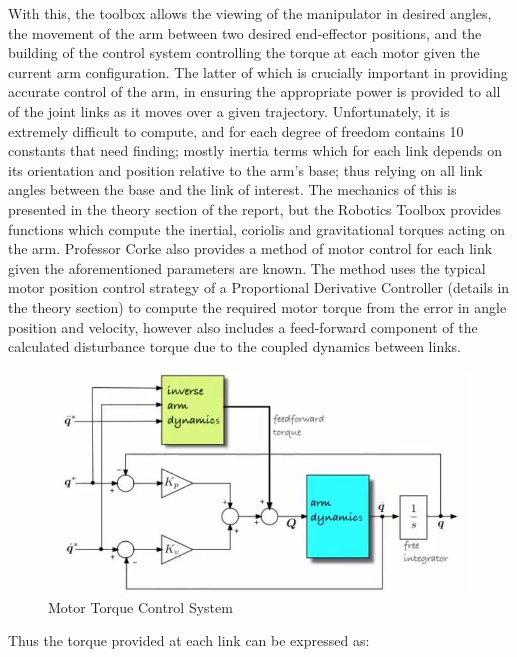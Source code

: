\documentclass[12pt,openany,a4paper]{book}
\begin{document}
With this, the toolbox allows the viewing of the manipulator in desired angles, the movement of the arm between two desired end-effector positions, and the building of the control system controlling the torque at each motor given the current arm configuration. The latter of which is crucially important in providing accurate control of the arm, in ensuring the appropriate power is provided to all of the joint links as it moves over a given trajectory. Unfortunately, it is extremely difficult to compute, and for each degree of freedom contains 10 constants that need finding; mostly inertia terms which for each link depends on its orientation and position relative to the arm's base; thus relying on all link angles between the base and the link of interest. The mechanics of this is presented in the theory section of the report, but the Robotics Toolbox provides functions which compute the inertial, coriolis and gravitational torques acting on the arm. Professor Corke also provides a method of motor control for each link given the aforementioned parameters are known. The method uses the typical motor position control strategy of a Proportional Derivative Controller (details in the theory section) to compute the required motor torque from the error in angle position and velocity, however also includes a feed-forward component of the calculated disturbance torque due to the coupled dynamics between links. 

\begin{center}
\begin{figure}[htb]
  \includegraphics[width=\linewidth]{Correcting_for_disturbance_torque.jpg}
\caption{Motor Torque Control System}
\end{figure}
\end{center}

Thus the torque provided at each link can be expressed as:
\end{document}
